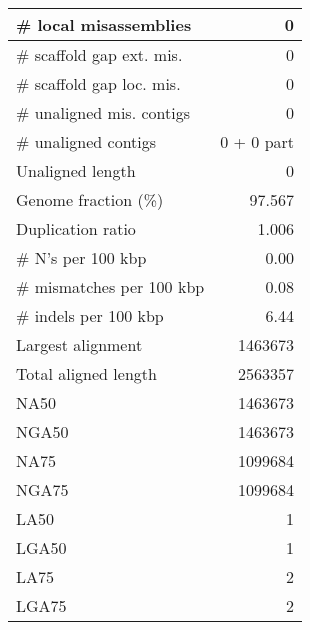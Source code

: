 \documentclass[12pt,a4paper]{article}
\begin{document}
\begin{table}[ht]
\begin{center}
\begin{tabular}{|l*{1}{|r}|}
\# local misassemblies & 0 \\ \hline
\# scaffold gap ext. mis. & 0 \\ \hline
\# scaffold gap loc. mis. & 0 \\ \hline
\# unaligned mis. contigs & 0 \\ \hline
\# unaligned contigs & 0 + 0 part \\ \hline
Unaligned length & 0 \\ \hline
Genome fraction (\%) & 97.567 \\ \hline
Duplication ratio & 1.006 \\ \hline
\# N's per 100 kbp & 0.00 \\ \hline
\# mismatches per 100 kbp & 0.08 \\ \hline
\# indels per 100 kbp & 6.44 \\ \hline
Largest alignment & 1463673 \\ \hline
Total aligned length & 2563357 \\ \hline
NA50 & 1463673 \\ \hline
NGA50 & 1463673 \\ \hline
NA75 & 1099684 \\ \hline
NGA75 & 1099684 \\ \hline
LA50 & 1 \\ \hline
LGA50 & 1 \\ \hline
LA75 & 2 \\ \hline
LGA75 & 2 \\ \hline
\end{tabular}
\end{center}
\end{table}
\end{document}
